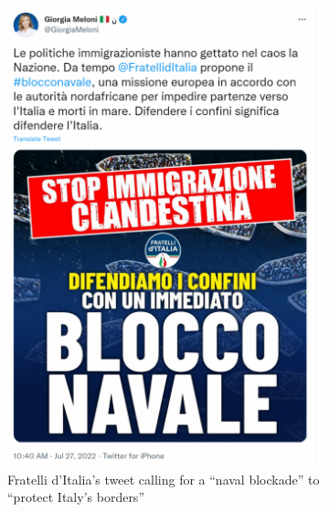 \documentclass[sigchi]{acmart}
\begin{document}
\begin{figure}[h]
\begin{subfigure}{.515\columnwidth}
  \centering
  \includegraphics[width=\linewidth]{report/img/Meloni_tweet.png}
  \caption{Fratelli d'Italia’s tweet calling for a “naval blockade” to “protect Italy’s borders”}
  \label{fig:melonitweet}
\end{subfigure}%
\hfill
\begin{subfigure}{.4\columnwidth}
  \centering

\end{subfigure}
\end{figure}
\end{document}
